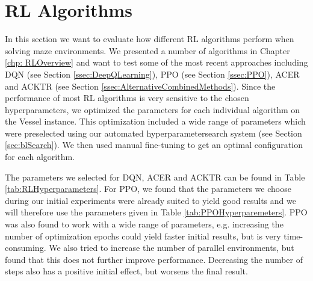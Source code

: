 \section{RL Algorithms} \label{sec:EvalRLAlgorithms}
In this section we want to evaluate how different RL algorithms perform when solving maze environments. We presented a number of algorithms in Chapter \ref{chp: RLOverview} and want to test some of the most recent approaches including DQN (see Section \ref{ssec:DeepQLearning}), PPO (see Section \ref{ssec:PPO}), ACER and ACKTR (see Section \ref{ssec:AlternativeCombinedMethods}). Since the performance of most RL algorithms is very sensitive to the chosen hyperparameters, we optimized the parameters for each individual algorithm on the Vessel instance. This optimization included a wide range of parameters which were preselected using our automated hyperparametersearch system (see Section \ref{sec:blSearch}). We then used manual fine-tuning to get an optimal configuration for each algorithm. 

The parameters we selected for DQN, ACER and ACKTR can be found in Table \ref{tab:RLHyperparameters}. For PPO, we found that the parameters we choose during our initial experiments were already suited to yield good results and we will therefore use the parameters given in Table \ref{tab:PPOHyperparemeters}. PPO was also found to work with a wide range of parameters, e.g. increasing the number of optimization epochs could yield faster initial results, but is very time-consuming. We also tried to increase the number of parallel environments, but found that this does not further improve performance. Decreasing the number of steps also has a positive initial effect, but worsens the final result.

